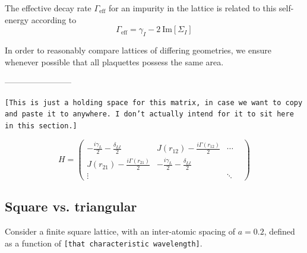 \documentclass[aps,pra,superscriptaddress,twocolumn]{revtex4-1}
\newcommand{\im}{\mathrm{Im}}
\newcommand{\commentSB}[1]{\texttt{\color{blue}[#1]}}
\newcommand{\commentTP}[1]{\texttt{\color{green}[#1]}}
\begin{document}
The effective decay rate $\Gamma_\text{eff}$ for an impurity in the lattice is related to this self-energy according to 
\begin{equation}
    \Gamma_\text{eff} = \gamma_I - 2~\im[\Sigma_I]
\end{equation}






In order to reasonably compare lattices of differing geometries, we ensure whenever possible that all plaquettes possess the same area.

------------------------

\commentSB{This is just a holding space for this matrix, in case we want to copy and paste it to anywhere. I don't actually intend for it to sit here in this section.}

\begin{equation}
    H = 
    \begin{pmatrix}
        -\frac{i \gamma_L}{2} - \frac{\delta_{LI}}{2} & J(r_{12}) - \frac{i \Gamma(r_{12})}{2} & \cdots \\
        J(r_{21}) - \frac{i \Gamma(r_{21})}{2} & -\frac{i \gamma_L}{2} - \frac{\delta_{LI}}{2} & & \\
        \vdots & & \ddots
    \end{pmatrix}
\end{equation}


\subsection{Square vs. triangular}

Consider a finite square lattice, with an inter-atomic spacing of $a = 0.2$, defined as a function of \commentSB{that characteristic wavelength}. 
\end{document}
